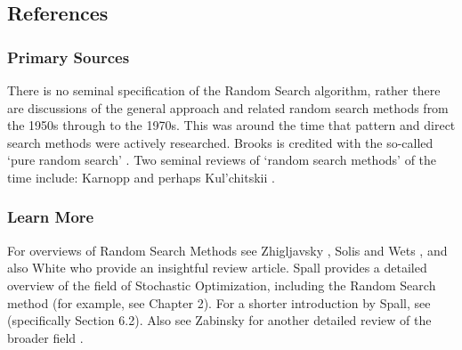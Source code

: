 

\subsection{References}

% 
% 
\subsubsection{Primary Sources}
There is no seminal specification of the Random Search algorithm, rather there are discussions of the general approach and related random search methods from the 1950s through to the 1970s. This was around the time that pattern and direct search methods were actively researched.
Brooks is credited with the so-called `pure random search' \cite{Brooks1958}. Two seminal reviews of `random search methods' of the time include: Karnopp \cite{Karnopp1963} and perhaps Kul'chitskii \cite{Kulchitskii1976}.

% 
% 
\subsubsection{Learn More}
For overviews of Random Search Methods see Zhigljavsky \cite{Zhigljavsky1991}, Solis and Wets \cite{Solis1981}, and also White \cite{White1971} who provide an insightful review article.
Spall provides a detailed overview of the field of Stochastic Optimization, including the Random Search method \cite{Spall2003} (for example, see Chapter 2). For a shorter introduction by Spall, see \cite{Spall2004} (specifically Section 6.2). Also see Zabinsky for another detailed review of the broader field \cite{Zabinsky2003}.

